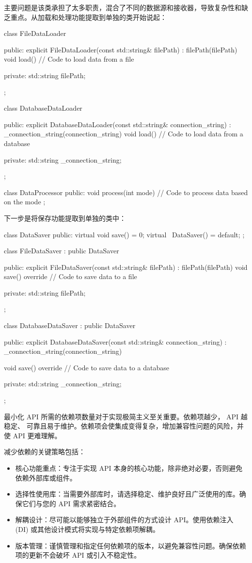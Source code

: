 主要问题是该类承担了太多职责，混合了不同的数据源和接收器，导致复杂性和缺乏重点。从加载和处理功能提取到单独的类开始说起：

\begin{cpp}
class FileDataLoader {
public:
    explicit FileDataLoader(const std::string& filePath) : filePath(filePath) {}
    void load() {
        // Code to load data from a file
    }

private:
    std::string filePath;
};

class DatabaseDataLoader {
public:
    explicit DatabaseDataLoader(const std::string& connection_string)
    : _connection_string(connection_string) {}
    void load() {
        // Code to load data from a database
    }

private:
    std::string _connection_string;
};

class DataProcessor {
public:
    void process(int mode) {
        // Code to process data based on the mode
    }
};
\end{cpp}

下一步是将保存功能提取到单独的类中：

\begin{cpp}
class DataSaver {
public:
    virtual void save() = 0;
    virtual ~DataSaver() = default;
};

class FileDataSaver : public DataSaver {
public:
    explicit FileDataSaver(const std::string& filePath) :
    filePath(filePath) {}
    void save() override {
        // Code to save data to a file
    }

private:
    std::string filePath;
};

class DatabaseDataSaver : public DataSaver {
public:
    explicit DatabaseDataSaver(const std::string& connection_string) : _connection_string(connection_string) {}

    void save() override {
        // Code to save data to a database
    }

private:
    std::string _connection_string;
};
\end{cpp}

最小化 API 所需的依赖项数量对于实现极简主义至关重要。依赖项越少， API 越稳定、 可靠且易于维护。依赖项会使集成变得复杂，增加兼容性问题的风险，并使 API 更难理解。

减少依赖的关键策略包括：

\begin{itemize}
\item
核心功能重点：专注于实现 API 本身的核心功能，除非绝对必要，否则避免依赖外部库或组件。

\item
选择性使用库：当需要外部库时，请选择稳定、维护良好且广泛使用的库。确保它们与您的 API 需求紧密结合。

\item
解耦设计：尽可能以能够独立于外部组件的方式设计 API。使用依赖注入 (DI) 或其他设计模式将实现与特定依赖项解耦。

\item
版本管理：谨慎管理和指定任何依赖项的版本，以避免兼容性问题。确保依赖项的更新不会破坏 API 或引入不稳定性。
\end{itemize}

